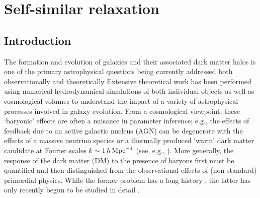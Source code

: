 \chapter{Self-similar relaxation}
\label{chap:self-sim-relxn}

\section{Introduction}
\label{sec:intro}


\noindent
The formation and evolution of galaxies and their associated dark matter halos is one of the primary astrophysical questions being currently addressed both observationally \cite{2020SDSS_Ahumadaetal_16th_data,2017Willetetal_GalxayZoo_HST,2023Harikane_etal_JWST}
and theoretically \cite{2015SomervilleDave,2018WechslerTinker}
Extensive theoretical work has been performed using numerical hydrodynamical simulations of both individual objects \cite{2006Dekel&Birnboim,2014Hopkins_FIRE,2015LauNagaietal,2023FIRE-2_publicrelease} as well as cosmological volumes \cite{2010Schaye_OWLS,2014Genel_Illustris,2015Schaye_EAGLE,2017Kaviraj_HorizonAGN,2018TNG_Pillepich_etal,2019Dave_SIMBA,2021camels_presentation} 
to understand the impact of a variety of astrophysical processes involved in galaxy evolution. From a cosmological viewpoint, these `baryonic' effects are often a nuisance in parameter inference; e.g., the effects of feedback due to an active galactic nucleus (AGN) can be degenerate with the effects of a massive neutrino species or a thermally produced `warm' dark matter candidate at Fourier scales $k\sim1\,h\,{\rm Mpc}^{-1}$ (see, e.g., \cite{2019Chisari_etal_Baryfeedback,2020AricoAnguloetal_baryonifi}).
More generally, the response of the dark matter (DM) to the presence of baryons first must be quantified and then distinguished from the observational effects of (non-standard) primordial physics. While the former problem has a long history \cite{1986Blumenthal,2004Gnesin_etal,2005SellwoodMcGaugh,2006Gustafsson_FS,2010Abadi_NFBS,2010DuffySchaye_etal,2010PedrosaTissera_etal,2010TisseraWhite_etal,2019ArtalePedrosa_etal,2022ForouharMoreno_etal,2023Velmani&Paranjape},
the latter has only recently begun to be studied in detail \cite{2011TeyssierMMDM,2015SchneiderTeyssier,2015Mead_PHJH,2020AricoAnguloetal_baryonifi,2021AricoAnguloetal_baryonifi,2023EuclidCastro_etal}.


